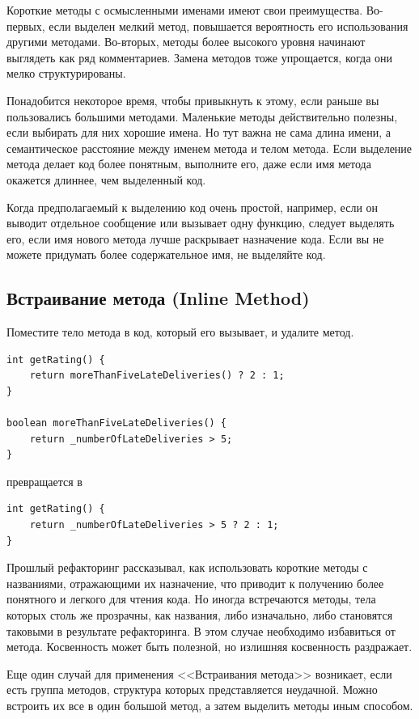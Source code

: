 \documentclass{../../text-style}
\begin{document}
Короткие методы с осмысленными именами имеют свои преимущества. Во-первых, если выделен мелкий метод, повышается вероятность его использования другими методами. Во-вторых, методы более высокого уровня начинают выглядеть как ряд комментариев. Замена методов тоже упрощается, когда они мелко структурированы.

Понадобится некоторое время, чтобы привыкнуть к этому, если раньше вы пользовались большими методами. Маленькие методы действительно полезны, если выбирать для них хорошие имена. Но тут важна не сама длина имени, а семантическое расстояние между именем метода и телом метода. Если выделение метода делает код более понятным, выполните его, даже если имя метода окажется длиннее, чем выделенный код.

Когда предполагаемый к выделению код очень простой, например, если он выводит отдельное сообщение или вызывает одну функцию, следует выделять его, если имя нового метода лучше раскрывает назначение кода. Если вы не можете придумать более содержательное имя, не выделяйте код.

\subsection{Встраивание метода (Inline Method)}

Поместите тело метода в код, который его вызывает, и удалите метод.

\begin{verbatim}
int getRating() {
    return moreThanFiveLateDeliveries() ? 2 : 1;
}

boolean moreThanFiveLateDeliveries() {
    return _numberOfLateDeliveries > 5;
}
\end{verbatim}

превращается в

\begin{verbatim}
int getRating() {
    return _numberOfLateDeliveries > 5 ? 2 : 1;
}
\end{verbatim}

Прошлый рефакторинг рассказывал, как использовать короткие методы с названиями, отражающими их назначение, что приводит к получению более понятного и легкого для чтения кода. Но иногда встречаются методы, тела которых столь же прозрачны, как названия, либо изначально, либо становятся таковыми в результате рефакторинга. В этом случае необходимо избавиться от метода. Косвенность может быть полезной, но излишняя косвенность раздражает.

Еще один случай для применения <<Встраивания метода>> возникает, если есть группа методов, структура которых представляется неудачной. Можно встроить их все в один большой метод, а затем выделить методы иным способом. 
\end{document}
